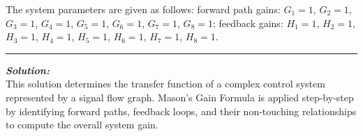 \documentclass[11pt]{article}
\begin{document}
\noindent The system parameters are given as follows: forward path gains: \( G_1 = 1 \), \( G_2 = 1 \), \( G_3 = 1 \), \( G_4 = 1 \), \( G_5 = 1 \), \( G_6 = 1 \), \( G_7 = 1 \), \( G_8 = 1 \); feedback gains: \( H_1 = 1 \), \( H_2 = 1 \), \( H_3 = 1 \), \( H_4 = 1 \), \( H_5 = 1 \), \( H_6 = 1 \), \( H_7 = 1 \), \( H_8 = 1 \). \\
\noindent\rule{\textwidth}{1pt}

\vspace{12pt}   

\noindent \textbf{\textit{Solution:}}
\\ This solution determines the transfer function of a complex control system represented by a signal flow graph. Mason's Gain Formula is applied step-by-step by identifying forward paths, feedback loops, and their non-touching relationships to compute the overall system gain.\\
\end{document}

